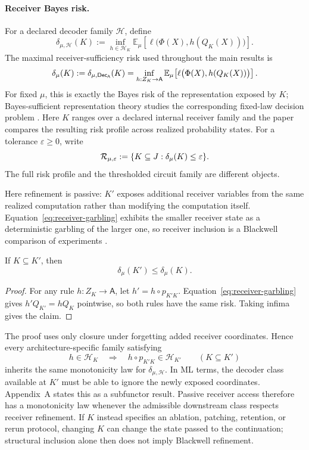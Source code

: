 \paragraph{Receiver Bayes risk.}
For a declared decoder family $\mathscr H$, define
\begin{equation}
\delta_{\mu,\mathscr H}(K)
:=
\inf_{h\in\mathscr H_K}
\mathbb E_\mu\!\left[\ell\bigl(\Phi(X),h(Q_K(X))\bigr)\right].
\label{eq:receiver-risk-general}
\end{equation}
The maximal receiver-sufficiency risk used throughout the main results is
\begin{equation}
\delta_\mu(K)
:=
\delta_{\mu,\mathsf{Dec}_{\mathsf A}}(K)
=
\inf_{h:Z_K\to\mathsf A}
\mathbb E_\mu\!\left[\ell\bigl(\Phi(X),h(Q_K(X))\bigr)\right].
\label{eq:receiver-risk}
\end{equation}
For fixed $\mu$, this is exactly the Bayes risk of the representation exposed by $K$; Bayes-sufficient representation theory studies the corresponding fixed-law decision problem \citep{sevetlidis2026bayes}. Here $K$ ranges over a declared internal receiver family and the paper compares the resulting risk profile across realized probability states. For a tolerance $\varepsilon\ge0$, write
\[
\mathcal{R}_{\mu,\varepsilon}:=\{K\subseteq J:\delta_\mu(K)\le\varepsilon\}.
\]
The full risk profile and the thresholded circuit family are different objects.

Here refinement is passive: $K'$ exposes additional receiver variables from the same realized computation rather than modifying the computation itself. Equation~\eqref{eq:receiver-garbling} exhibits the smaller receiver state as a deterministic garbling of the larger one, so receiver inclusion is a Blackwell comparison of experiments \citep{blackwell1951comparison,fritz2023experiments}.
\begin{proposition}
\label{thm:receiver-defect-monotonicity}
If $K\subseteq K'$, then
\[
\delta_\mu(K')\le \delta_\mu(K).
\]
\end{proposition}
\begin{proof}
For any rule $h:Z_K\to\mathsf A$, let $h'=h\circ p_{K'K}$. Equation~\eqref{eq:receiver-garbling} gives $h'Q_{K'}=hQ_K$ pointwise, so both rules have the same risk. Taking infima gives the claim.
\end{proof}

The proof uses only closure under forgetting added receiver coordinates. Hence every architecture-specific family satisfying
\[
h\in\mathscr H_K\quad\Longrightarrow\quad h\circ p_{K'K}\in\mathscr H_{K'}
\qquad(K\subseteq K')
\]
inherits the same monotonicity law for $\delta_{\mu,\mathscr H}$. In ML terms, the decoder class available at $K'$ must be able to ignore the newly exposed coordinates. Appendix~A states this as a subfunctor result. Passive receiver access therefore has a monotonicity law whenever the admissible downstream class respects receiver refinement. If $K$ instead specifies an ablation, patching, retention, or rerun protocol, changing $K$ can change the state passed to the continuation; structural inclusion alone then does not imply Blackwell refinement.

